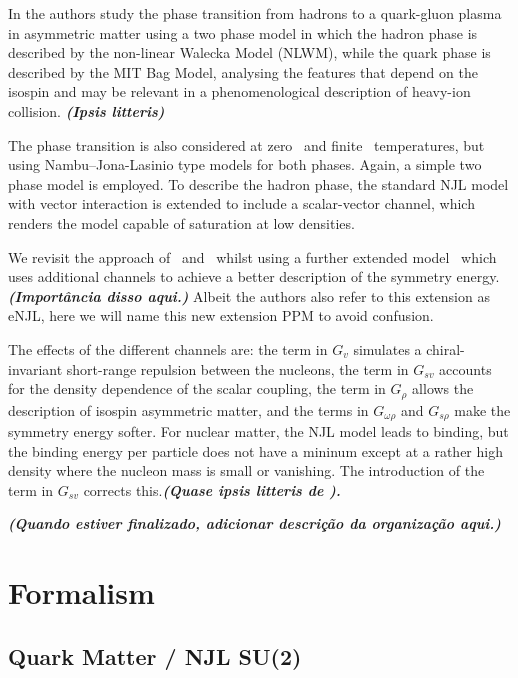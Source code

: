 \documentclass[prc, reprint, amsmath, floatfix, linenumbers,10pt]{revtex4-1}
\newcommand{\comment}[1]{{\bf\textit{#1}}}
\begin{document}
In \cite{Cavagnoli2011} the authors study the phase transition from hadrons to a quark-gluon plasma in asymmetric matter using a two phase model in which the hadron phase is described by the non-linear Walecka Model (NLWM), while the quark phase is described by the MIT Bag Model, analysing the features that depend on the isospin and may be relevant in a phenomenological description of heavy-ion collision. \comment{(Ipsis litteris)}

The phase transition is also considered at zero~\cite{Tsue2010} and finite~\cite{Lee2013} temperatures, but using Nambu--Jona-Lasinio type models for both phases. Again, a simple two phase model is employed. To describe the hadron phase, the standard NJL model with vector interaction is extended to include a scalar-vector channel, which renders the model capable of saturation at low densities.

We revisit the approach of~\cite{Tsue2010} and~\cite{Lee2013} whilst using a further extended model~\cite{Pais2016} which uses additional channels to achieve a better description of the symmetry energy. \comment{(Importância disso aqui.)} Albeit the authors also refer to this extension as eNJL, here we will name this new extension PPM to avoid confusion.

The effects of the different channels are: the term in $G_v$ simulates a chiral-invariant short-range repulsion between the nucleons, the term in $G_{sv}$ accounts for the density dependence of the scalar coupling, the term in $G_\rho$ allows the description of isospin asymmetric matter, and the terms in $G_{\omega\rho}$ and $G_{s\rho}$ make the symmetry energy softer. For nuclear matter, the NJL model leads to binding, but the binding energy per particle does not have a mininum except at a rather high density where the nucleon mass is small or vanishing. The introduction of the term in $G_{sv}$ corrects this.\comment{(Quase ipsis litteris de \cite{Pais2016}).}


\comment{(Quando estiver finalizado, adicionar descrição da organização aqui.)}

\section{Formalism}

\subsection{Quark Matter / NJL SU(2)}
\end{document}
